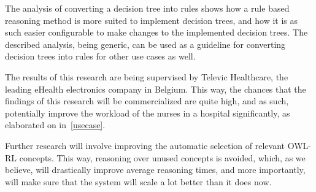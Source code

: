 The analysis of converting a decision tree into rules shows how a rule based reasoning method is more suited to implement decision trees, and how it is as such easier configurable to make changes to the implemented decision trees.
The described analysis, being generic, can be used as a guideline for converting decision trees into rules for other use cases as well.

The results of this research are being supervised by Televic Healthcare, the leading eHealth electronics company in Belgium.
This way, the chances that the findings of this research will be commercialized are quite high, and as such, potentially improve the workload of the nurses in a hospital significantly, as elaborated on in~\ref{usecase}.

Further research will involve improving the automatic selection of relevant OWL-RL concepts.
This way, reasoning over unused concepts is avoided, which, as we believe, 
will drastically improve average reasoning times, and more importantly, will make sure that the system will 
scale a lot better than it does now.



